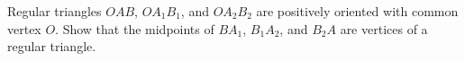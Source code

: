 Regular triangles $OAB$, $OA_1B_1$, and $OA_2B_2$ are positively oriented with common vertex $O$. Show that the midpoints of $BA_1$, $B_1A_2$, and $B_2A$ are vertices of a regular triangle.
